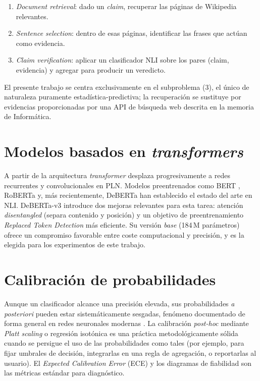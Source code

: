 \begin{enumerate}[leftmargin=*,itemsep=0.2em]
  \item \emph{Document retrieval}: dado un \emph{claim}, recuperar las
        páginas de Wikipedia relevantes.
  \item \emph{Sentence selection}: dentro de esas páginas, identificar
        las frases que actúan como evidencia.
  \item \emph{Claim verification}: aplicar un clasificador NLI sobre los
        pares (claim, evidencia) y agregar para producir un veredicto.
\end{enumerate}

El presente trabajo se centra exclusivamente en el subproblema (3), el
único de naturaleza puramente estadística-predictiva; la recuperación se
sustituye por evidencias proporcionadas por una API de búsqueda web
descrita en la memoria de Informática.

\section{Modelos basados en \emph{transformers}}

A partir de \citet{vaswani2017attention} la arquitectura
\emph{transformer} desplaza progresivamente a redes recurrentes y
convolucionales en PLN. Modelos preentrenados como BERT
\citep{devlin2019bert}, RoBERTa \citep{liu2019roberta} y, más
recientemente, DeBERTa \citep{he2021deberta,he2023debertav3} han
establecido el estado del arte en NLI. DeBERTa-v3 introduce dos
mejoras relevantes para esta tarea: atención \emph{disentangled} (separa
contenido y posición) y un objetivo de preentrenamiento \emph{Replaced
Token Detection} más eficiente. Su versión \emph{base} (184\,M
parámetros) ofrece un compromiso favorable entre coste computacional y
precisión, y es la elegida para los experimentos de este trabajo.

\section{Calibración de probabilidades}

Aunque un clasificador alcance una precisión elevada, sus probabilidades
\emph{a posteriori} pueden estar sistemáticamente sesgadas, fenómeno
documentado de forma general en redes neuronales modernas
\citep{guo2017calibration}. La calibración \emph{post-hoc} mediante
\emph{Platt scaling} \citep{platt1999probabilistic} o regresión
isotónica \citep{zadrozny2002transforming} es una práctica
metodológicamente sólida cuando se persigue el uso de las probabilidades
como tales (por ejemplo, para fijar umbrales de decisión, integrarlas
en una regla de agregación, o reportarlas al usuario). El
\emph{Expected Calibration Error} (ECE) y los diagramas de fiabilidad
\citep{niculescu2005predicting} son las métricas estándar para
diagnóstico.

